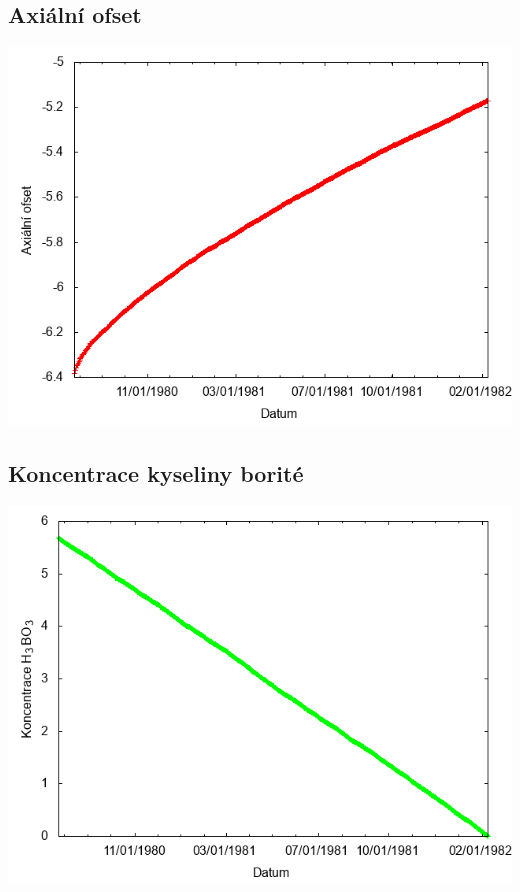 \documentclass[a4paper,twoside,11pt]{article}
\begin{document}
\subsection*{Axiální ofset}
\begin{center}
\includegraphics[width=.8\textwidth]{graphs/CandyMountain_12_ao.png}
\end{center}

\subsection*{Koncentrace kyseliny borité}
\begin{center}
\includegraphics[width=.8\textwidth]{graphs/CandyMountain_12_bc.png}
\end{center}
\end{document}
